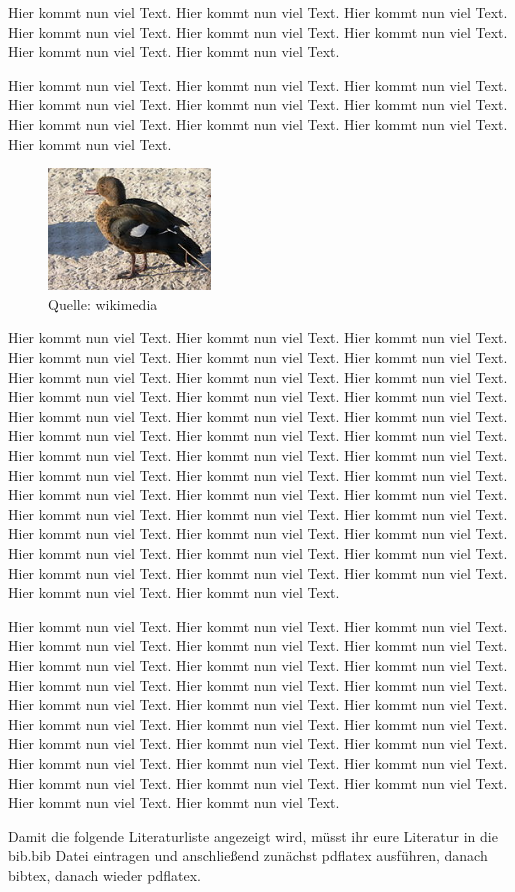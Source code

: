 Hier kommt nun viel Text. Hier kommt nun viel Text. Hier kommt nun viel Text. Hier kommt nun viel Text. Hier kommt nun viel Text. Hier kommt nun viel Text. Hier kommt nun viel Text. Hier kommt nun viel Text.
\par\smallskip

Hier kommt nun viel Text. Hier kommt nun viel Text. Hier kommt nun viel Text. Hier kommt nun viel Text. Hier kommt nun viel Text. Hier kommt nun viel Text. Hier kommt nun viel Text. Hier kommt nun viel Text. Hier kommt nun viel Text. Hier kommt nun viel Text.
\begin{figure} %
    \includegraphics[width=4.3cm]{images/Ente}
    \caption{\small{Quelle: wikimedia}}
\end{figure}
Hier kommt nun viel Text. Hier kommt nun viel Text. Hier kommt nun viel Text. Hier kommt nun viel Text. Hier kommt nun viel Text. Hier kommt nun viel Text. Hier kommt nun viel Text. Hier kommt nun viel Text. Hier kommt nun viel Text. Hier kommt nun viel Text.  Hier kommt nun viel Text. Hier kommt nun viel Text. Hier kommt nun viel Text. Hier kommt nun viel Text. Hier kommt nun viel Text. Hier kommt nun viel Text. Hier kommt nun viel Text. Hier kommt nun viel Text. Hier kommt nun viel Text. Hier kommt nun viel Text. Hier kommt nun viel Text. Hier kommt nun viel Text. Hier kommt nun viel Text. Hier kommt nun viel Text. Hier kommt nun viel Text. Hier kommt nun viel Text. Hier kommt nun viel Text. Hier kommt nun viel Text. Hier kommt nun viel Text. Hier kommt nun viel Text. Hier kommt nun viel Text. Hier kommt nun viel Text. Hier kommt nun viel Text. Hier kommt nun viel Text. Hier kommt nun viel Text. Hier kommt nun viel Text. Hier kommt nun viel Text. Hier kommt nun viel Text. Hier kommt nun viel Text. Hier kommt nun viel Text.   Hier kommt nun viel Text.
\par\smallskip %
Hier kommt nun viel Text. Hier kommt nun viel Text. Hier kommt nun viel Text. Hier kommt nun viel Text. Hier kommt nun viel Text. Hier kommt nun viel Text. Hier kommt nun viel Text. Hier kommt nun viel Text. Hier kommt nun viel Text. Hier kommt nun viel Text. Hier kommt nun viel Text. Hier kommt nun viel Text. Hier kommt nun viel Text.   Hier kommt nun viel Text. Hier kommt nun viel Text. Hier kommt nun viel Text. Hier kommt nun viel Text. Hier kommt nun viel Text. Hier kommt nun viel Text. Hier kommt nun viel Text. Hier kommt nun viel Text. Hier kommt nun viel Text. Hier kommt nun viel Text.   Hier kommt nun viel Text. Hier kommt nun viel Text. Hier kommt nun viel Text. Hier kommt nun viel Text. Hier kommt nun viel Text.   Hier kommt nun viel Text.
\par\bigskip %

Damit die folgende Literaturliste angezeigt wird, müsst ihr eure Literatur in die bib.bib Datei eintragen und anschließend zunächst pdflatex ausführen, danach bibtex, danach wieder pdflatex.

